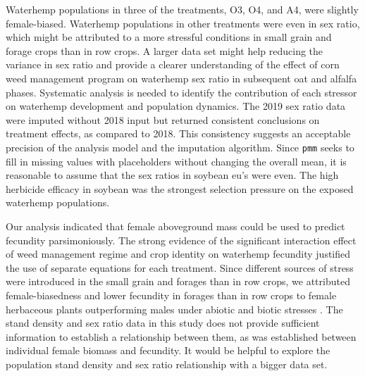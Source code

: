 \documentclass[utf8]{frontiersSCNS}
\begin{document}
Waterhemp populations in three of the treatments, O3, O4, and A4, were slightly female-biased. Waterhemp populations in other treatments were even in sex ratio, which might be attributed to a more stressful conditions in small grain and forage crops than in row crops. A larger data set might help reducing the variance in sex ratio and provide a clearer understanding of the effect of corn weed management program on waterhemp sex ratio in subsequent oat and alfalfa phases. Systematic analysis is needed to identify the contribution of each stressor on waterhemp development and population dynamics. The 2019 sex ratio data were imputed without 2018 input but returned consistent conclusions on treatment effects, as compared to 2018. This consistency suggests an acceptable precision of the analysis model and the imputation algorithm. Since \texttt{pmm} seeks to fill in missing values with placeholders without changing the overall mean, it is reasonable to assume that the sex ratios in soybean eu's were even. The high herbicide efficacy in soybean was the strongest selection pressure on the exposed waterhemp populations.

Our analysis indicated that female aboveground mass could be used to predict fecundity parsimoniously. The strong evidence of the significant interaction effect of weed management regime and crop identity on waterhemp fecundity justified the use of separate equations for each treatment. Since different sources of stress were introduced in the small grain and forages than in row crops, we attributed female-biasedness and lower fecundity in forages than in row crops to female herbaceous plants outperforming males under abiotic and biotic stresses \citep{juvanySexrelatedDifferencesStress2015}. The stand density and sex ratio data in this study does not provide sufficient information to establish a relationship between them, as was established between individual female biomass and fecundity. It would be helpful to explore the population stand density and sex ratio relationship with a bigger data set.
\end{document}
